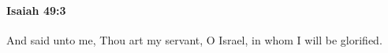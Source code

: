 
		\paragraph{Isaiah 49:3} %
			\label{ISAIAH-49-3}

			And said unto me, Thou art my servant, O Israel, in whom I will be glorified.


